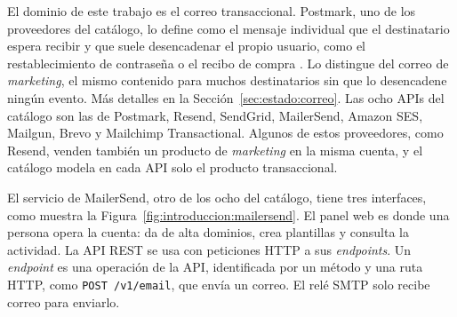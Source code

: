 El dominio de este trabajo es el correo transaccional. Postmark, uno de los
proveedores del catálogo, lo define como el mensaje individual que el
destinatario espera recibir y que suele desencadenar el propio usuario, como
el restablecimiento de contraseña o el recibo de compra
\citep{postmarktransaccional}. Lo distingue del correo de \textit{marketing},
el mismo contenido para muchos destinatarios sin que lo desencadene ningún
evento. Más detalles en la Sección~\ref{sec:estado:correo}. Las ocho APIs del catálogo son las de Postmark, Resend, SendGrid,
MailerSend, Amazon SES, Mailgun, Brevo y Mailchimp Transactional. Algunos de
estos proveedores, como Resend, venden también un producto de
\textit{marketing} en la misma cuenta, y el catálogo modela en cada API solo
el producto transaccional.

El servicio de MailerSend, otro de los ocho del catálogo, tiene tres
interfaces, como muestra la Figura~\ref{fig:introduccion:mailersend}. El panel
web es donde una persona opera la cuenta: da de alta dominios, crea plantillas
y consulta la actividad. La API REST se usa con peticiones HTTP a sus
\textit{endpoints}. Un \textit{endpoint} es una operación de la API,
identificada por un método y una ruta HTTP, como \texttt{POST /v1/email}, que
envía un correo. El relé SMTP solo recibe correo para enviarlo.

